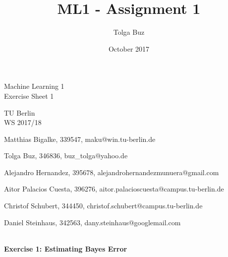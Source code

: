 \documentclass{article}
\title{ML1 - Assignment 1}
\author{Tolga Buz}
\date{October 2017}
\begin{document}
\begin{centering}
\begin{LARGE}
Machine Learning 1 \\
Exercise Sheet 1 \\
\end{LARGE}
\vspace{0.5cm}
TU Berlin\\
WS 2017/18
\vspace{0.5cm}

\begin{description}
\item[Group: BSSBCH]
\item Matthias Bigalke, 339547, maku@win.tu-berlin.de 
\item Tolga Buz, 346836, buz\_tolga@yahoo.de 
\item Alejandro Hernandez, 395678, alejandrohernandezmunuera@gmail.com 
\item Aitor Palacios Cuesta, 396276, aitor.palacioscuesta@campus.tu-berlin.de 
\item Christof Schubert, 344450, christof.schubert@campus.tu-berlin.de 
\item Daniel Steinhaus, 342563, dany.steinhaus@googlemail.com 
\end{description}
\end{centering}

\begin{verbatim}
\end{verbatim}

\paragraph{Exercise 1: Estimating Bayes Error}
\end{document}
